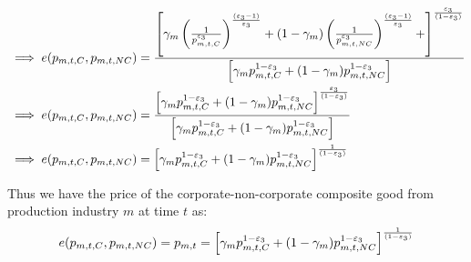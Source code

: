 \begin{equation}
\begin{split}
&\implies e(p_{m,t,C},p_{m,t,NC}) = 
\frac{\left[\gamma_{m}\left( \frac{1}{p_{m,t,C}^{\varepsilon_{3}}}\right)^{\frac{(\varepsilon_{3}-1)}{\varepsilon_{3}}}+(1-\gamma_{m})\left(\frac{1}{p_{m,t,NC}^{\varepsilon_{3}}}\right)^{\frac{(\varepsilon_{3}-1)}{\varepsilon_{3}}}+\right]^{\frac{\varepsilon_{3}}{(1-\varepsilon_{3})}}}{\left[\gamma_{m}p_{m,t,C}^{1-\varepsilon_{3}}+(1-\gamma_{m})p_{m,t,NC}^{1-\varepsilon_{3}}\right]}\\
&\implies e(p_{m,t,C},p_{m,t,NC}) = 
\frac{\left[\gamma_{m}p_{m,t,C}^{1-\varepsilon_{3}}+(1-\gamma_{m})p_{m,t,NC}^{1-\varepsilon_{3}}\right]^{\frac{\varepsilon_{3}}{(1-\varepsilon_{3})}}}{\left[\gamma_{m}p_{m,t,C}^{1-\varepsilon_{3}}+(1-\gamma_{m})p_{m,t,NC}^{1-\varepsilon_{3}}\right]}\\
&\implies e(p_{m,t,C},p_{m,t,NC}) = 
\left[\gamma_{m}p_{m,t,C}^{1-\varepsilon_{3}}+(1-\gamma_{m})p_{m,t,NC}^{1-\varepsilon_{3}}\right]^{\frac{1}{(1-\varepsilon_{3})}}\\
\end{split}
\end{equation}   

Thus we have the price of the corporate-non-corporate composite good from production industry $m$ at time $t$ as:
\begin{equation}
 e(p_{m,t,C},p_{m,t,NC})=p_{m,t}=\left[\gamma_{m}p_{m,t,C}^{1-\varepsilon_{3}}+(1-\gamma_{m})p_{m,t,NC}^{1-\varepsilon_{3}}\right]^{\frac{1}{(1-\varepsilon_{3})}}
 \end{equation}
 


    
    